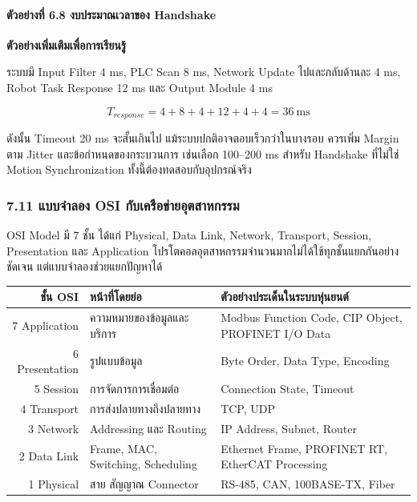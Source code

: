 \paragraph{ตัวอย่างที่ 6.8 งบประมาณเวลาของ Handshake}

\textbf{ตัวอย่างเพิ่มเติมเพื่อการเรียนรู้}

ระบบมี Input Filter 4 ms, PLC Scan 8 ms, Network Update ไปและกลับด้านละ 4 ms, Robot Task Response 12 ms และ Output Module 4 ms

\[
T_{response}=4+8+4+12+4+4=36\ \text{ms}
\]

ดังนั้น Timeout 20 ms จะสั้นเกินไป แม้ระบบปกติอาจตอบเร็วกว่าในบางรอบ ควรเพิ่ม Margin ตาม Jitter และข้อกำหนดของกระบวนการ เช่นเลือก 100–200 ms สำหรับ Handshake ที่ไม่ใช่ Motion Synchronization ทั้งนี้ต้องทดสอบกับอุปกรณ์จริง



\subsubsection{7.11 แบบจำลอง OSI กับเครือข่ายอุตสาหกรรม}

OSI Model มี 7 ชั้น ได้แก่ Physical, Data Link, Network, Transport, Session, Presentation และ Application โปรโตคอลอุตสาหกรรมจำนวนมากไม่ได้ใช้ทุกชั้นแยกกันอย่างชัดเจน แต่แบบจำลองช่วยแยกปัญหาได้

\begin{table}[htbp]
    \centering
    \begin{tabular}{r l l}
        \hline
        \textbf{ชั้น OSI} & \textbf{หน้าที่โดยย่อ} & \textbf{ตัวอย่างประเด็นในระบบหุ่นยนต์} \\
        \hline
        7 Application & ความหมายของข้อมูลและบริการ & Modbus Function Code, CIP Object, PROFINET I/O Data \\
        6 Presentation & รูปแบบข้อมูล & Byte Order, Data Type, Encoding \\
        5 Session & การจัดการการเชื่อมต่อ & Connection State, Timeout \\
        4 Transport & การส่งปลายทางถึงปลายทาง & TCP, UDP \\
        3 Network & Addressing และ Routing & IP Address, Subnet, Router \\
        2 Data Link & Frame, MAC, Switching, Scheduling & Ethernet Frame, PROFINET RT, EtherCAT Processing \\
        1 Physical & สาย สัญญาณ Connector & RS-485, CAN, 100BASE-TX, Fiber \\
        \hline
    \end{tabular}
\end{table}

